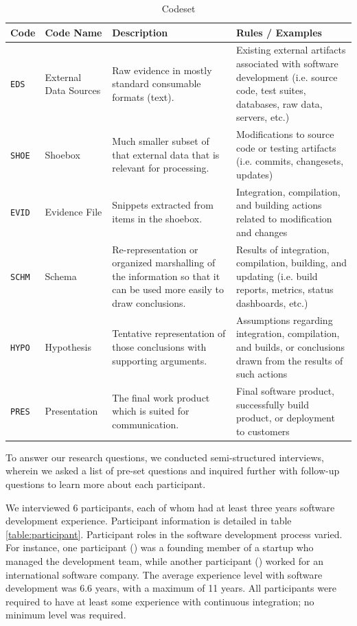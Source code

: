 \documentclass{sig-alternate}
\begin{document}
\begin{table}
\label{table:codeset}
\centering
\caption{Codeset}
\begin{tabular}[b]{ | l | l | p{5.5cm} | p{6.5cm} | }
	\hline
	\rowcolor{black!20!} Code & Code Name & Description & Rules / Examples \\ \hline
	\texttt{EDS} & External Data Sources & Raw evidence in mostly standard consumable formats (text). & Existing external artifacts associated with software development (i.e. source code, test suites, databases, raw data, servers, etc.) \\ \hline
	\texttt{SHOE} & Shoebox & Much smaller subset of that external data that is relevant for processing. & Modifications to source code or testing artifacts (i.e. commits, changesets, updates) \\ \hline
	\texttt{EVID} & Evidence File & Snippets extracted from items in the shoebox. & Integration, compilation, and building actions related to modification and changes \\ \hline
	\texttt{SCHM} & Schema & Re-representation or organized marshalling of the information so that it can be used more easily to draw conclusions. & Results of integration, compilation, building, and updating (i.e. build reports, metrics, status dashboards, etc.) \\ \hline
	\texttt{HYPO} & Hypothesis & Tentative representation of those conclusions with supporting arguments. & Assumptions regarding integration, compilation, and builds, or conclusions drawn from the results of such actions \\ \hline
	\texttt{PRES} & Presentation & The final work product which is suited for communication. & Final software product, successfully build product, or deployment to customers \\ \hline
\end{tabular}
\end{table}

To answer our research questions, we conducted semi-structured interviews, wherein we asked a list of pre-set questions and inquired further with follow-up questions to learn more about each participant.

We interviewed 6 participants, each of whom had at least three years software development experience. Participant information is detailed in table \ref{table:participant}. Participant roles in the software development process varied. For instance, one participant (\cpg) was a founding member of a startup who managed the development team, while another participant (\david) worked for an international software company. The average experience level with software development was 6.6 years, with a maximum of 11 years. All participants were required to have at least some experience with continuous integration; no minimum level was required.
\end{document}
